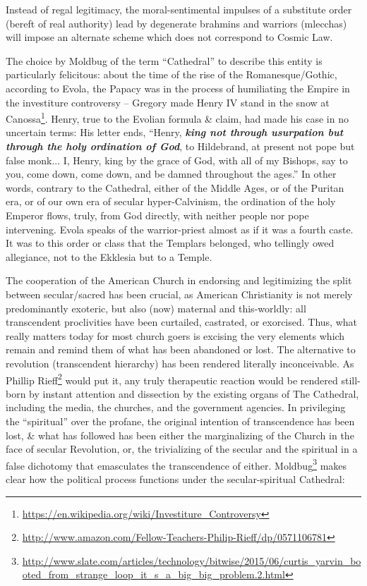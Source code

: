 Instead of regal legitimacy, the moral-sentimental impulses of a substitute order (bereft of real authority) lead by degenerate brahmins and warriors (mlecchas) will impose an alternate scheme which does not correspond to Cosmic Law.

The choice by Moldbug of the term ``Cathedral'' to describe this entity is particularly felicitous: about the time of the rise of the Romanesque/Gothic, according to Evola, the Papacy was in the process of humiliating the Empire in the investiture controversy -- Gregory made Henry IV stand in the snow at Canossa\footnote{\url{https://en.wikipedia.org/wiki/Investiture\_Controversy}}. Henry, true to the Evolian formula \& claim, had made his case in no uncertain terms: His letter ends, ``Henry, \textbf{\emph{king not through usurpation but through the holy ordination of God}}, to Hildebrand, at present not pope but false monk... I, Henry, king by the grace of God, with all of my Bishops, say to you, come down, come down, and be damned throughout the ages.'' In other words, contrary to the Cathedral, either of the Middle Ages, or of the Puritan era, or of our own era of secular hyper-Calvinism, the ordination of the holy Emperor flows, truly, from God directly, with neither people nor pope intervening. Evola speaks of the warrior-priest almost as if it was a fourth caste. It was to this order or class that the Templars belonged, who tellingly owed allegiance, not to the Ekklesia but to a Temple.

The cooperation of the American Church in endorsing and legitimizing the split between secular/sacred has been crucial, as American Christianity is not merely predominantly exoteric, but also (now) maternal and this-worldly: all transcendent proclivities have been curtailed, castrated, or exorcised. Thus, what really matters today for most church goers is excising the very elements which remain and remind them of what has been abandoned or lost. The alternative to revolution (transcendent hierarchy) has been rendered literally inconceivable. As Phillip Rieff\footnote{\url{http://www.amazon.com/Fellow-Teachers-Philip-Rieff/dp/0571106781}} would put it, any truly therapeutic reaction would be rendered still-born by instant attention and dissection by the existing organs of The Cathedral, including the media, the churches, and the government agencies. In privileging the ``spiritual'' over the profane, the original intention of transcendence has been lost, \& what has followed has been either the marginalizing of the Church in the face of secular Revolution, or, the trivializing of the secular and the spiritual in a false dichotomy that emasculates the transcendence of either. Moldbug\footnote{\url{http://www.slate.com/articles/technology/bitwise/2015/06/curtis\_yarvin\_booted\_from\_strange\_loop\_it\_s\_a\_big\_big\_problem.2.html}} makes clear how the political process functions under the secular-spiritual Cathedral:

